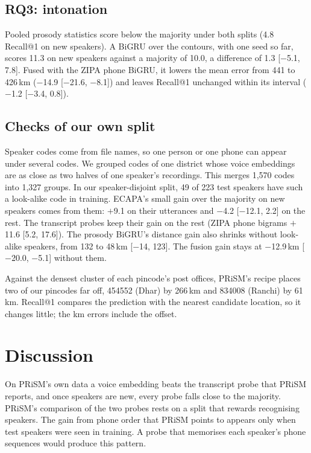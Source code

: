 \documentclass[11pt]{article}
\begin{document}
\subsection{RQ3: intonation}
Pooled prosody statistics score below the majority under both splits (4.8 Recall@1 on new speakers). A BiGRU over
the contours, with one seed so far, scores 11.3 on new speakers against a majority of 10.0, a difference of 1.3
[$-$5.1, 7.8]. Fused with the ZIPA phone BiGRU, it lowers the mean error from 441 to 426\,km ($-$14.9 [$-$21.6,
$-$8.1]) and leaves Recall@1 unchanged within its interval ($-$1.2 [$-$3.4, 0.8]).

\subsection{Checks of our own split}
Speaker codes come from file names, so one person or one phone can appear under several codes. We grouped codes of
one district whose voice embeddings are as close as two halves of one speaker's recordings. This merges 1,570
codes into 1,327 groups. In our speaker-disjoint split, 49 of 223 test speakers have such a look-alike code in
training. ECAPA's small gain over the majority on new speakers comes from them: $+$9.1 on their utterances and
$-$4.2 [$-$12.1, 2.2] on the rest. The transcript probes keep their gain on the rest (ZIPA phone bigrams $+$11.6
[5.2, 17.6]). The prosody BiGRU's distance gain also shrinks without look-alike speakers, from 132 to 48\,km
[$-$14, 123]. The fusion gain stays at $-$12.9\,km [$-$20.0, $-$5.1] without them.

Against the densest cluster of each pincode's post offices, PRiSM's recipe places two of our pincodes far off,
454552 (Dhar) by 266\,km and 834008 (Ranchi) by 61\,km. Recall@1 compares the prediction with the nearest
candidate location, so it changes little; the km errors include the offset.

\section{Discussion}
\label{sec:discussion}
On PRiSM's own data a voice embedding beats the transcript probe that PRiSM reports, and once speakers are new,
every probe falls close to the majority. PRiSM's comparison of the two probes rests on a split that rewards
recognising speakers. The gain from phone order that PRiSM points to appears only when test speakers were seen in
training. A probe that memorises each speaker's phone sequences would produce this pattern.
\end{document}
